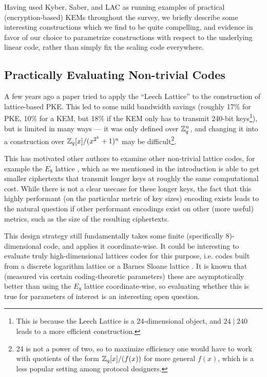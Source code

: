 \label{sec: new-theory-constructions}
Having used Kyber, Saber, and LAC as running examples of practical (encryption-based) KEMs throughout the survey, we briefly describe some interesting constructions which we find to be quite compelling, and evidence in favor of our choice to parametrize constructions with respect to the underlying linear code, rather than simply fix the scaling code everywhere.


\subsection{Practically Evaluating Non-trivial Codes}\label{ssec: non-trivial codes}
A few years ago a paper \cite{Leech} tried to apply the ``Leech Lattice'' to the construction of lattice-based PKE.
This led to some mild bandwidth savings (roughly 17\% for PKE, 10\% for a KEM, but 18\% if the KEM only has to transmit 240-bit keys\footnote{This is because the Leech Lattice is a 24-dimensional object, and $24\mid 240$ leads to a more efficient construction.}), but is limited in many ways --- it was only defined over $\mathbb{Z}_q^n$, and changing it into a construction over $\mathbb{Z}_q[x] / (x^{2^k}+1)^n$ may be difficult\footnote{24 is not a power of two, so to maximize efficiency one would have to work with quotients of the form $\mathbb{Z}_q[x] / (f(x))$ for more general $f(x)$, which is a less popular setting among protocol designers.}.

This has motivated other authors to examine other non-trivial lattice codes, for example the $E_8$ lattice \cite{E8}, which as we mentioned in the introduction is able to get smaller ciphertexts that transmit longer keys at roughly the same computational cost.
While there is not a clear usecase for these longer keys, the fact that this highly performant (on the particular metric of key sizes) encoding exists leads to the natural question if other performant encodings exist on other (more useful) metrics, such as the size of the resulting ciphertexts.

This design strategy still fundamentally takes some finite (specifically 8)-dimensional code, and applies it coordinate-wise.
It could be interesting to evaluate truly high-dimensional lattices codes for this purpose, i.e. codes built from a discrete logarithm lattice \cite{Dloglattice} or a Barnes Sloane lattice \cite{BarnesSloane}.
It is known that (measured via certain coding-theoretic parameters) these are asymptotically better than using the $E_8$ lattice coordinate-wise, so evaluating whether this is true for parameters of interest is an interesting open question.

